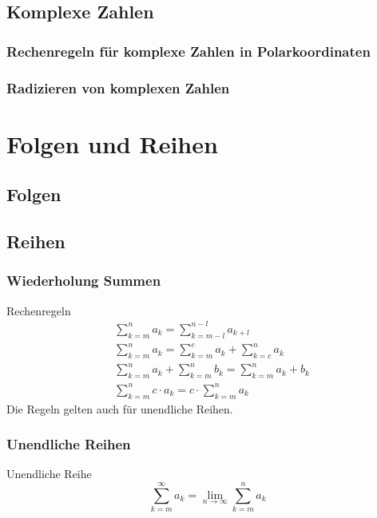 \documentclass[german]{spicker}
\begin{document}
\subsection{Komplexe Zahlen}
\subsubsection{Rechenregeln für komplexe Zahlen in Polarkoordinaten}

\subsubsection{Radizieren von komplexen Zahlen}

\section{Folgen und Reihen}
\subsection{Folgen}

\subsection{Reihen}
\subsubsection{Wiederholung Summen}
\begin{defi}{Rechenregeln}
    \begin{align}
         & \sum_{k=m}^n a_k = \sum_{k=m-l}^{n-l} a_{k+l}                \\
         & \sum_{k=m}^n a_k = \sum_{k=m}^c a_k + \sum_{k=c}^n a_k       \\
         & \sum_{k=m}^n a_k + \sum_{k=m}^n b_k = \sum_{k=m}^n a_k + b_k \\
         & \sum_{k=m}^n c\cdot a_k = c\cdot\sum_{k=m}^n a_k
    \end{align}
    Die Regeln gelten auch für unendliche Reihen.
\end{defi}

\subsubsection{Unendliche Reihen}
\begin{defi}{Unendliche Reihe}
    \[
        \sum_{k=m}^{\infty} a_k = \lim_{n\to\infty} \sum_{k=m}^{n} a_k
    \]
\end{defi}
\end{document}
